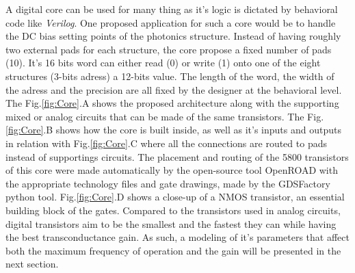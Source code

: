 A digital core can be used for many thing as it's logic is dictated by behavioral code like \textit{Verilog}.
One proposed application for such a core would be to handle the DC bias setting points of the photonics structure.
Instead of having roughly two external pads for each structure, the core propose a fixed number of pads (10).
It's 16 bits word can either read (0) or write (1) onto one of the eight structures (3-bits adress) a 12-bits value. 
The length of the word, the width of the adress and the precision are all fixed by the designer at the behavioral level. 
The Fig.\ref{fig:Core}.A shows the proposed architecture along with the supporting mixed or analog circuits that can be made of the same transistors. 
The Fig.\ref{fig:Core}.B shows how the core is built inside, as well as it's inputs and outputs in relation with Fig.\ref{fig:Core}.C where all the connections are routed to pads instead of supportings circuits. 
The placement and routing of the 5800 transistors of this core were made automatically by the open-source tool OpenROAD\cite{ajayi_openroad_2019} with the appropriate technology files and gate drawings, made by the GDSFactory python tool.
Fig.\ref{fig:Core}.D shows a close-up of a NMOS transistor, an essential building block of the gates. 
Compared to the transistors used in analog circuits, digital transistors aim to be the smallest and the fastest they can while having the best transconductance gain. 
As such, a modeling of it's parameters that affect both the maximum frequency of operation and the gain will be presented in the next section. 



 